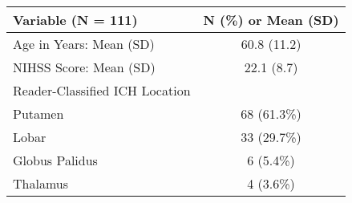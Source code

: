 \begin{table}[ht]
\centering
\begin{tabular}{lc}
  \hline { Variable (N = 111)} & { N (\%) or Mean (SD)} \\ 
  \hline
Age in Years: Mean (SD) & 60.8 (11.2) \\ 
   \hline
NIHSS Score: Mean (SD) & 22.1 (8.7) \\ 
   \hline
Reader-Classified ICH Location &  \\ 
   \hline
\text{  } Putamen & 68 (61.3\%) \\ 
   \hline
\text{  } Lobar & 33 (29.7\%) \\ 
   \hline
\text{  } Globus Palidus & 6 (5.4\%) \\ 
   \hline
\text{  } Thalamus & 4 (3.6\%) \\ 
   \hline
\end{tabular}
\caption{} 
\label{t:dem}
\end{table}
